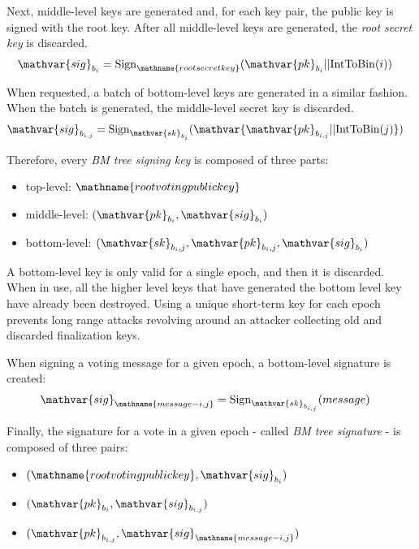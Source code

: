Next, middle-level keys are generated and, for each key pair, the public key is signed with the root key.
After all middle-level keys are generated, the \emph{root secret key} is discarded.
\begin{align*}
	\mathvar{sig}_{b_i} &= \mathfunc{Sign}_{\mathname{root secret key}}(\mathvar{pk}_{b_i} || \mathfunc{IntToBin}(i))
\end{align*}

When requested, a batch of  bottom-level keys are generated in a similar fashion.
When the batch is generated, the middle-level secret key is discarded.
\begin{align*}
	\mathvar{sig}_{b_{i,j}} &= \mathfunc{Sign}_{\mathvar{sk}_{b_i}}(\mathvar{\mathvar{pk}_{b_{i, j}} || \mathfunc{IntToBin}(j) })
\end{align*}


Therefore, every \emph{BM tree signing key} is composed of three parts:
\begin{itemize}
	\item{top-level: $\mathname{root voting public key}$}
	\item{middle-level: $(\mathvar{pk}_{b_i}, \mathvar{sig}_{b_i})$}
	\item{bottom-level: $(\mathvar{sk}_{b_i, j}, \mathvar{pk}_{b_i, j}, \mathvar{sig}_{b_i})$}
\end{itemize}

A bottom-level key is only valid for a single epoch, and then it is discarded.
When in use, all the higher level keys that have generated the bottom level key have already been destroyed.
Using a unique short-term key for each epoch prevents long range attacks revolving around an attacker collecting old and discarded finalization keys.

When signing a voting message for a given epoch, a bottom-level signature is created:
\begin{align*}
	\mathvar{sig}_{\mathname{message-i,j}} &= \mathfunc{Sign}_{\mathvar{sk}_{b_{i,j}}}(message)
\end{align*}


Finally, the signature for a vote in a given epoch - called \emph{BM tree signature} - is composed of three pairs:
\begin{itemize}
	\item{$(\mathname{root voting public key}, \mathvar{sig}_{b_i} )$}
	\item{$(\mathvar{pk}_{b_i}, \mathvar{sig}_{b_{i, j}})$}
	\item{$(\mathvar{pk}_{b_{i,j}}, \mathvar{sig}_{\mathname{message-i,j}})$}
\end{itemize}

